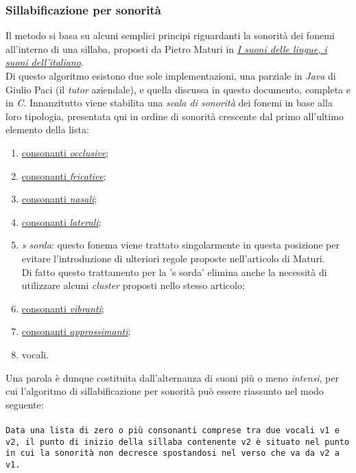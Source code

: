       \subsubsection{Sillabificazione per sonorità} 
      Il metodo si basa su alcuni semplici principi riguardanti la sonorità dei fonemi all'interno di una sillaba, proposti da 
      Pietro Maturi in \href{https://www.mulino.it/isbn/9788815133052}{\textit{I suoni delle lingue, i suoni dell'italiano}}. \\
      Di questo algoritmo esistono due sole implementazioni, una parziale in \textit{Java} di Giulio Paci (il \textit{tutor} aziendale), 
      e quella discussa in questo documento, completa e in \textit{C}.
      Innanzitutto viene stabilita una \textit{scala di sonorità} dei fonemi in base alla loro tipologia, presentata qui in ordine
      di sonorità crescente dal primo all'ultimo elemento della lista:
      \begin{enumerate}
        \item {\hyperref[glo:consoccl]{consonanti \emph{occlusive}\glsfirstoccur}};
        \item {\hyperref[glo:consfric]{consonanti \emph{fricative}\glsfirstoccur}};
        \item {\hyperref[glo:consnasa]{consonanti \emph{nasali}\glsfirstoccur}};
        \item {\hyperref[glo:conslate]{consonanti \emph{laterali}\glsfirstoccur}};
        \item \textit{s sorda}: questo fonema viene trattato singolarmente in questa posizione per evitare
          l'introduzione di ulteriori regole proposte nell'articolo di Maturi.\\  Di fatto questo trattamento per
          la 's sorda' elimina anche la necessità di utilizzare alcuni \textit{cluster} proposti nello stesso articolo;
        \item {\hyperref[glo:consvibr]{consonanti \emph{vibranti}\glsfirstoccur}};
        \item {\hyperref[glo:consappr]{consonanti \emph{approssimanti}\glsfirstoccur}};
        \item vocali.
      \end{enumerate}
      Una parola è dunque costituita dall'alternanza di suoni più o meno \textit{intensi},
      per cui l'algoritmo di sillabificazione per sonorità può
      essere riassunto nel modo seguente: \\ \\
                \texttt{Data una lista di zero o più consonanti comprese tra due vocali v1 e v2, il punto di inizio della sillaba
                   contenente v2 è situato nel punto in cui la sonorità non decresce spostandosi nel verso che va da v2
                   a v1.} \\ \\
          

